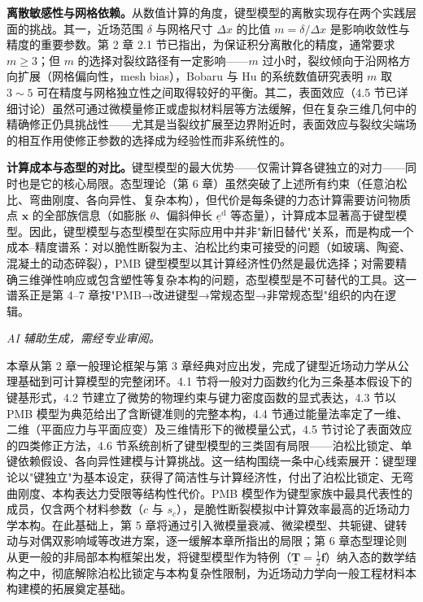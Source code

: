 \textbf{离散敏感性与网格依赖。}从数值计算的角度，键型模型的离散实现存在两个实践层面的挑战。其一，近场范围 $\delta$ 与网格尺寸 $\Delta x$ 的比值 $m=\delta/\Delta x$ 是影响收敛性与精度的重要参数。第 2 章 2.1 节已指出，为保证积分离散化的精度，通常要求 $m\geq 3$；但 $m$ 的选择对裂纹路径有一定影响——$m$ 过小时，裂纹倾向于沿网格方向扩展（网格偏向性，mesh bias），Bobaru 与 Hu \cite{BobaruHu2012} 的系统数值研究表明 $m$ 取 $3\sim5$ 可在精度与网格独立性之间取得较好的平衡。其二，表面效应（4.5 节已详细讨论）虽然可通过微模量修正或虚拟材料层等方法缓解，但在复杂三维几何中的精确修正仍具挑战性——尤其是当裂纹扩展至边界附近时，表面效应与裂纹尖端场的相互作用使修正参数的选择成为经验性而非系统性的。

\textbf{计算成本与态型的对比。}键型模型的最大优势——仅需计算各键独立的对力——同时也是它的核心局限。态型理论（第 6 章）虽然突破了上述所有约束（任意泊松比、弯曲刚度、各向异性、复杂本构），但代价是每条键的力态计算需要访问物质点 $\mathbf{x}$ 的全部族信息（如膨胀 $\theta$、偏斜伸长 $\underline{e}^{\mathrm{d}}$ 等态量），计算成本显著高于键型模型。因此，键型模型与态型模型在实际应用中并非"新旧替代"关系，而是构成一个成本--精度谱系：对以脆性断裂为主、泊松比约束可接受的问题（如玻璃、陶瓷、混凝土的动态碎裂），PMB 键型模型以其计算经济性仍然是最优选择；对需要精确三维弹性响应或包含塑性等复杂本构的问题，态型模型是不可替代的工具。这一谱系正是第 4--7 章按"PMB→改进键型→常规态型→非常规态型"组织的内在逻辑。

\emph{AI 辅助生成，需经专业审阅。}

本章从第 2 章一般理论框架与第 3 章经典对应出发，完成了键型近场动力学从公理基础到可计算模型的完整闭环。4.1 节将一般对力函数约化为三条基本假设下的键基形式，4.2 节建立了微势的物理约束与键力密度函数的显式表达，4.3 节以 PMB 模型为典范给出了含断键准则的完整本构，4.4 节通过能量法率定了一维、二维（平面应力与平面应变）及三维情形下的微模量公式，4.5 节讨论了表面效应的四类修正方法，4.6 节系统剖析了键型模型的三类固有局限——泊松比锁定、单键依赖假设、各向异性建模与计算挑战。这一结构围绕一条中心线索展开：键型理论以"键独立"为基本设定，获得了简洁性与计算经济性，付出了泊松比锁定、无弯曲刚度、本构表达力受限等结构性代价。PMB 模型作为键型家族中最具代表性的成员，仅含两个材料参数（$c$ 与 $s_c$），是脆性断裂模拟中计算效率最高的近场动力学本构。在此基础上，第 5 章将通过引入微模量衰减、微梁模型、共轭键、键转动与对偶双影响域等改进方案，逐一缓解本章所指出的局限；第 6 章态型理论则从更一般的非局部本构框架出发，将键型模型作为特例（$\underline{\mathbf{T}}=\tfrac{1}{2}\mathbf{f}$）纳入态的数学结构之中，彻底解除泊松比锁定与本构复杂性限制，为近场动力学向一般工程材料本构建模的拓展奠定基础。
